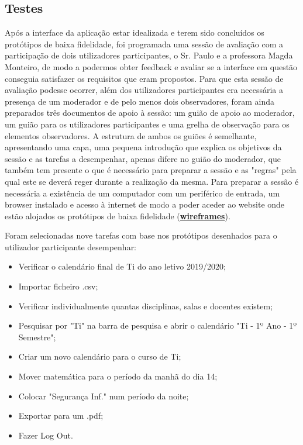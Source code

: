 \documentclass[11pt, twoside]{report}
\begin{document}
	\subsection{Testes}
	Após a interface da aplicação estar idealizada e terem sido concluídos os protótipos de baixa fidelidade, foi programada uma sessão de avaliação com a participação de dois utilizadores participantes, o Sr. Paulo e a professora Magda Monteiro, de modo a podermos obter feedback e avaliar se a interface em questão conseguia satisfazer os requisitos que eram propostos. Para que esta sessão de avaliação podesse ocorrer, além dos utilizadores participantes era necessária a presença de um moderador e de pelo menos dois observadores, foram ainda preparados três documentos de apoio à sessão: um guião de apoio ao moderador, um guião para os utilizadores participantes e uma grelha de observação para os elementos observadores. A estrutura de ambos os guiões é semelhante, apresentando uma capa, uma pequena introdução que explica os objetivos da sessão e as tarefas a desempenhar, apenas difere no guião do moderador, que também tem presente o que é necessário para preparar a sessão e as "regras" pela qual este se deverá reger durante a realização da mesma. Para preparar a sessão é necessária a existência de um computador com um periférico de entrada, um browser instalado e acesso à internet de modo a poder aceder ao website onde estão alojados os protótipos de baixa fidelidade (\href{https://www.figma.com/file/nhb5nnIrt3fdDoQhYpsN80/Calendario?node-id=9\%3A154}{\textbf{wireframes}}).
	
	Foram selecionadas nove tarefas com base nos protótipos desenhados para o utilizador participante desempenhar:
	
	\begin{itemize}
		\item Verificar o calendário final de Ti do ano letivo 2019/2020;
		\item Importar ficheiro .csv;
		\item Verificar individualmente quantas disciplinas, salas e docentes existem;
		\item Pesquisar por "Ti" na barra de pesquisa e abrir o calendário "Ti - 1º Ano - 1º Semestre";
		\item Criar um novo calendário para o curso de Ti;
		\item Mover matemática para o período da manhã do dia 14;
		\item Colocar "Segurança Inf." num período da noite;
		\item Exportar para um .pdf;
		\item Fazer Log Out.
	\end{itemize}
	
\end{document}
